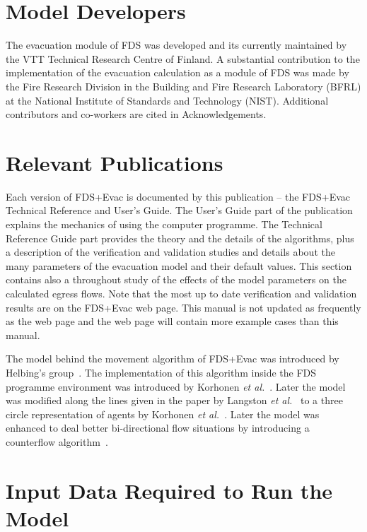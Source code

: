 \documentclass[12pt,a4paper,final,twoside]{stylevk}
\begin{document}
\section{Model Developers}

\noindent The evacuation module of FDS was developed and its currently
maintained by the VTT Technical Research Centre of Finland.  A
substantial contribution to the implementation of the evacuation
calculation as a module of FDS was made by the Fire Research Division
in the Building and Fire Research Laboratory (BFRL) at the National
Institute of Standards and Technology (NIST).  Additional contributors
and co-workers are cited in Acknowledgements.


\section{Relevant Publications}

\noindent Each version of FDS+Evac is documented by this publication
-- the FDS+Evac Technical Reference and User's Guide.  The User's
Guide part of the publication explains the mechanics of using the
computer programme.  The Technical Reference Guide part provides the
theory and the details of the algorithms, plus a description of the
verification and validation studies and details about the many
parameters of the evacuation model and their default values.  This
section contains also a throughout study of the effects of the model
parameters on the calculated egress flows.  Note that the most up to
date verification and validation results are on the FDS+Evac web page.
This manual is not updated as frequently as the web page and the web
page will contain more example cases than this manual.


The model behind the movement algorithm of FDS+Evac was introduced by
Helbing's group~\cite{Helbing95,Helbing00,Helbing02,Werner03}.  The
implementation of this algorithm inside the FDS programme environment
was introduced by Korhonen \emph{et al.}~\cite{Korhonen05}.  Later the
model was modified along the lines given in the paper by Langston
\emph{et al.}~\cite{Langston06} to a three circle representation of
agents by Korhonen \emph{et al.}~\cite{Korhonen07a, Korhonen07b,
  Korhonen08a, Korhonen08b}.  Later the model was enhanced to deal
better bi-directional flow situations by introducing a counterflow
algorithm~\cite{Heliovaara12}.


\section{Input Data Required to Run the Model}
\end{document}
